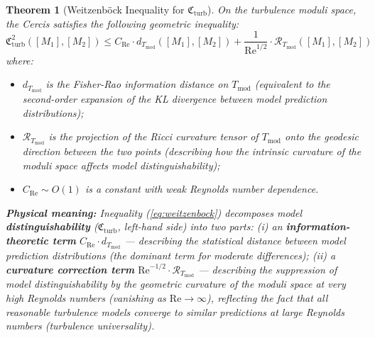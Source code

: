 \documentclass[12pt,a4paper]{article}
\theoremstyle{plain}
\newtheorem{theorem}{Theorem}[section]
\theoremstyle{definition}
\theoremstyle{remark}
\newcommand{\cercis}{\mathfrak{C}}
\newcommand{\Tmod}{T_{\text{mod}}}
\newcommand{\ReNum}{\mathrm{Re}}
\begin{document}
\begin{theorem}[Weitzenb\"ock Inequality for $\cercis_{\text{turb}}$]\label{thm:weitzenbock}
On the turbulence moduli space, the Cercis satisfies the following geometric inequality:
\begin{equation}
\cercis_{\text{turb}}^2([M_1], [M_2]) \leq C_{\text{Re}}\cdot d_{\Tmod}([M_1], [M_2]) + \frac{1}{\ReNum^{1/2}}\cdot \mathcal{R}_{\Tmod}([M_1], [M_2])
\label{eq:weitzenbock}
\end{equation}
where:
\begin{itemize}
    \item $d_{\Tmod}$ is the Fisher-Rao information distance on $\Tmod$ (equivalent to the second-order expansion of the KL divergence between model prediction distributions);
    \item $\mathcal{R}_{\Tmod}$ is the projection of the Ricci curvature tensor of $\Tmod$ onto the geodesic direction between the two points (describing how the intrinsic curvature of the moduli space affects model distinguishability);
    \item $C_{\text{Re}} \sim O(1)$ is a constant with weak Reynolds number dependence.
\end{itemize}

\textbf{Physical meaning:} Inequality (\ref{eq:weitzenbock}) decomposes model \textbf{distinguishability} ($\cercis_{\text{turb}}$, left-hand side) into two parts: (i) an \textbf{information-theoretic term} $C_{\text{Re}}\cdot d_{\Tmod}$ --- describing the statistical distance between model prediction distributions (the dominant term for moderate differences); (ii) a \textbf{curvature correction term} $\ReNum^{-1/2}\cdot\mathcal{R}_{\Tmod}$ --- describing the suppression of model distinguishability by the geometric curvature of the moduli space at very high Reynolds numbers (vanishing as $\ReNum\to\infty$), reflecting the fact that all reasonable turbulence models converge to similar predictions at large Reynolds numbers (turbulence universality).
\end{theorem}
\end{document}
